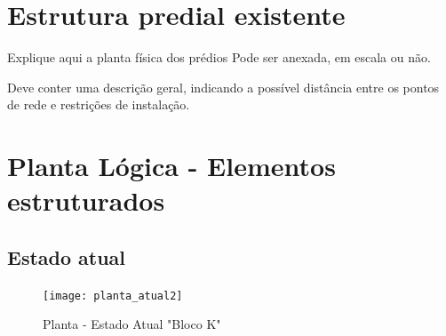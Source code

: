 \documentclass[	DIV=calc,%
paper=a4,%
fontsize=12pt,%
onecolumn]{scrartcl}	 					%
\begin{document}
	\section{Estrutura predial existente}
	
	Explique aqui a planta física dos prédios
	Pode ser anexada, em escala ou não.
	
	Deve conter uma descrição geral, indicando a possível distância entre os pontos de rede e restrições de instalação.
	
	\section{Planta Lógica - Elementos estruturados}
	
	\subsection{Estado atual}
	\begin{figure}
		\centering
		\caption{Planta - Estado Atual "Bloco K"}
		\texttt{[image: planta\_atual2]}
	\end{figure}
	
\end{document}
